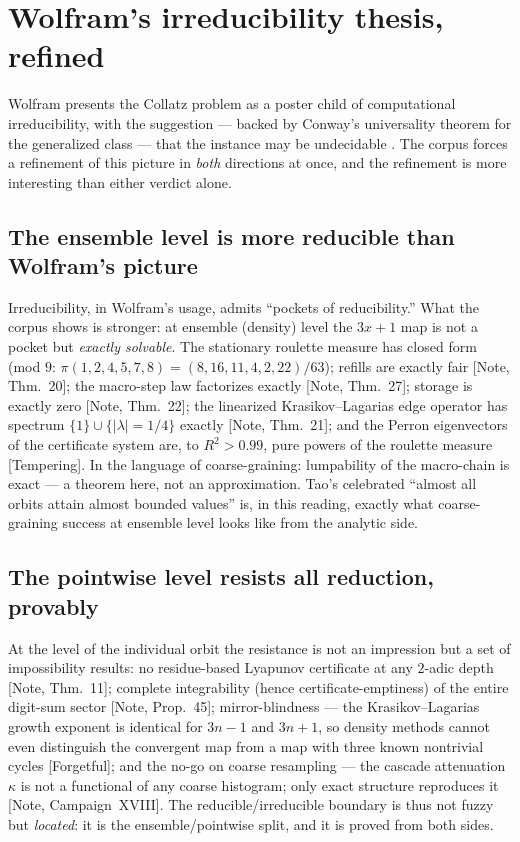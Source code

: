 \documentclass[11pt]{article}
\theoremstyle{definition}
\theoremstyle{remark}
\newcommand{\anchor}[1]{\textup{[#1]}}
\begin{document}
\section{Wolfram's irreducibility thesis, refined}
\label{sec:wolfram}

Wolfram presents the Collatz problem as a poster child of computational
irreducibility, with the suggestion --- backed by Conway's universality
theorem for the generalized class \cite{Conway1972} --- that the instance may
be undecidable \cite{Wolfram2002}. The corpus forces a refinement of this
picture in \emph{both} directions at once, and the refinement is more
interesting than either verdict alone.

\subsection{The ensemble level is more reducible than Wolfram's picture}

Irreducibility, in Wolfram's usage, admits ``pockets of reducibility.'' What
the corpus shows is stronger: at ensemble (density) level the $3x+1$ map is
not a pocket but \emph{exactly solvable}. The stationary roulette measure has
closed form (mod $9$: $\pi(1,2,4,5,7,8) = (8,16,11,4,2,22)/63$); refills are
exactly fair \anchor{Note, Thm.~20}; the macro-step law factorizes exactly
\anchor{Note, Thm.~27}; storage is exactly zero \anchor{Note, Thm.~22}; the
linearized Krasikov--Lagarias edge operator has spectrum
$\{1\} \cup \{|\lambda| = 1/4\}$ exactly \anchor{Note, Thm.~21}; and the
Perron eigenvectors of the certificate system are, to $R^2 > 0.99$, pure
powers of the roulette measure \anchor{Tempering}. In the language of
coarse-graining: lumpability of the macro-chain is exact --- a theorem here,
not an approximation. Tao's celebrated ``almost all orbits attain almost
bounded values'' \cite{Tao2019} is, in this reading, exactly what
coarse-graining success at ensemble level looks like from the analytic side.

\subsection{The pointwise level resists all reduction, provably}

At the level of the individual orbit the resistance is not an impression but
a set of impossibility results: no residue-based Lyapunov certificate at any
$2$-adic depth \anchor{Note, Thm.~11}; complete integrability (hence
certificate-emptiness) of the entire digit-sum sector \anchor{Note,
Prop.~45}; mirror-blindness --- the Krasikov--Lagarias growth exponent is
identical for $3n-1$ and $3n+1$, so density methods cannot even distinguish
the convergent map from a map with three known nontrivial cycles
\anchor{Forgetful}; and the no-go on coarse resampling --- the cascade
attenuation $\kappa$ is not a functional of any coarse histogram; only exact
structure reproduces it \anchor{Note, Campaign~XVIII}. The
reducible/irreducible boundary is thus not fuzzy but \emph{located}: it is
the ensemble/pointwise split, and it is proved from both sides.
\end{document}
